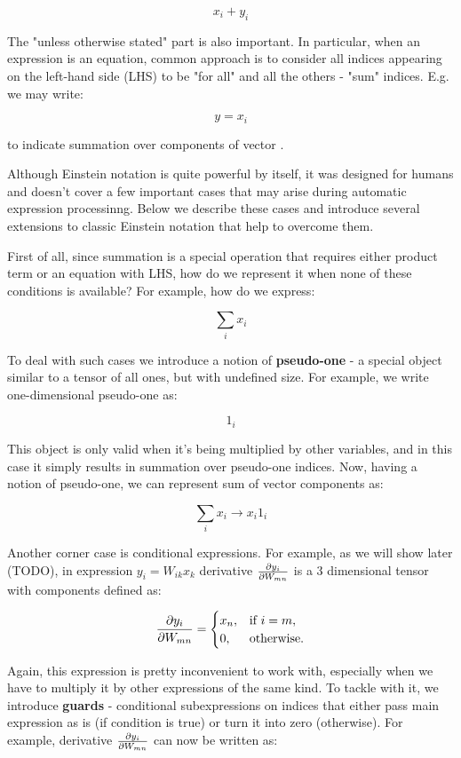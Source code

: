 \documentclass[conference]{IEEEtran}
\begin{document}
$$x_i + y_i$$

The "unless otherwise stated" part is also important. In particular,
when an expression is an equation, common approach is to consider all
indices appearing on the left-hand side (LHS) to be "for all" and all
the others - "sum" indices. E.g. we may write:

$$y = x_i$$

to indicate summation over components of vector .

Although Einstein notation is quite powerful by itself, it was
designed for humans and doesn't cover a few important cases that may
arise during automatic expression processinng. Below we describe these
cases and introduce several extensions to classic Einstein notation
that help to overcome them.

First of all, since summation is a special operation that requires
either product term or an equation with LHS, how do we represent it
when none of these conditions is available? For example, how do we
express:

$$\sum_ix_i$$

To deal with such cases we introduce a notion of \textbf{pseudo-one} -
a special object similar to a tensor of all ones, but with undefined
size. For example, we write one-dimensional pseudo-one as:

$$1_i$$

This object is only valid when it's being multiplied by other
variables, and in this case it simply results in summation over
pseudo-one indices. Now, having a notion of pseudo-one, we can
represent sum of vector components as:

$$\sum_ix_i \rightarrow x_i1_i$$

Another corner case is conditional expressions. For example, as we
will show later (TODO), in expression $y_i = W_{ik}x_k$ derivative
$\pdv{y_i}{W_{mn}}$ is a 3 dimensional tensor with components defined
as:

$$\pdv{y_i}{W_{mn}} = 
\begin{cases}
  x_n, & \text{if } i = m, \\
  0, & \text{otherwise}.
\end{cases}$$

Again, this expression is pretty inconvenient to work with, especially
when we have to multiply it by other expressions of the same kind. To
tackle with it, we introduce \textbf{guards} - conditional
subexpressions on indices that either pass main expression as is (if
condition is true) or turn it into zero (otherwise). For example,
derivative $\pdv{y_i}{W_{mn}}$ can now be written as:
\end{document}
